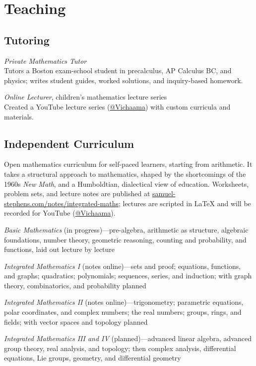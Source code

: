 \documentclass[11pt,letterpaper]{report} %
\newcommand{\listitemspace}{0.25em}
\renewenvironment{itemize}
{\begin{list}{}{\setlength{\leftmargin}{0em}
                \setlength{\parskip}{0em}
                \setlength{\itemsep}{\listitemspace}
                \setlength{\parsep}{\listitemspace}}}
{\end{list}}
\begin{document}
    \section*{Teaching}
    \subsection*{Tutoring}
    \begin{tablist}
        \item[2025--] \tab{}\textit{Private Mathematics Tutor} \\
                            Tutors a Boston exam-school student in precalculus, AP Calculus BC, and physics; writes student guides, worked solutions, and inquiry-based homework.
        \item[2023]   \tab{}\textit{Online Lecturer}, children's mathematics lecture series \\
                            Created a YouTube lecture series (\href{https://www.youtube.com/@Vichaama}{@Vichaama}) with custom curricula and materials.
    \end{tablist}

    \subsection*{Independent Curriculum}
    Open mathematics curriculum for self-paced learners, starting from arithmetic. It takes a structural approach to mathematics, shaped by the shortcomings of the 1960s \textit{New Math}, and a Humboldtian, dialectical view of education. Worksheets, problem sets, and lecture notes are published at \href{https://www.samuel-stephens.com/notes/integrated-maths/}{samuel-stephens.com/notes/integrated-maths}; lectures are scripted in \LaTeX{} and will be recorded for YouTube (\href{https://www.youtube.com/@Vichaama}{@Vichaama}).
    \begin{itemize}
        \item \textit{Basic Mathematics} (in progress)---pre-algebra, arithmetic as structure, algebraic foundations, number theory, geometric reasoning, counting and probability, and functions, laid out lecture by lecture
        \item \textit{Integrated Mathematics I} (notes online)---sets and proof; equations, functions, and graphs; quadratics; polynomials; sequences, series, and induction; with graph theory, combinatorics, and probability planned
        \item \textit{Integrated Mathematics II} (notes online)---trigonometry; parametric equations, polar coordinates, and complex numbers; the real numbers; groups, rings, and fields; with vector spaces and topology planned
        \item \textit{Integrated Mathematics III and IV} (planned)---advanced linear algebra, advanced group theory, real analysis, and topology; then complex analysis, differential equations, Lie groups, geometry, and differential geometry
    \end{itemize}
\end{document}
